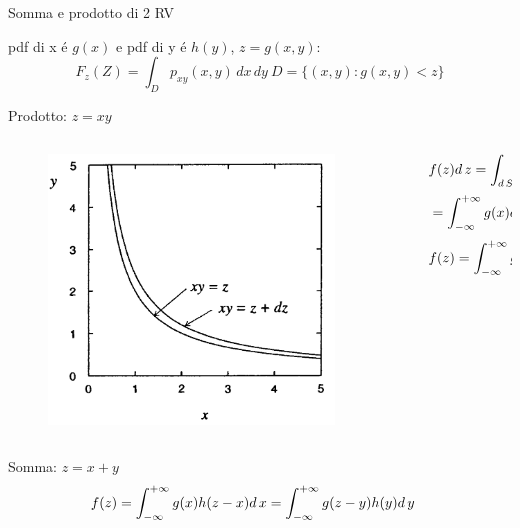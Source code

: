 \documentclass[asd-beamer.tex]{subfiles}
\begin{document}
\begin{frame}{Somma e prodotto di 2 RV}
\begin{block}{}
pdf di x \'e $g(x)$ e pdf di y \'e $h(y)$, $z=g(x,y)$:
\[F_z(Z)=\int_Dp_{xy}(x,y)\,dx\,dy\ D=\{(x,y):g(x,y)<z\}\]
\end{block}
\begin{block}{Prodotto: $z=xy$}
	\begin{columns}[T]
		\begin{column}{0.3\textwidth}
			\begin{figure}
				\centering
				\includegraphics[keepaspectratio,width=0.9\textwidth]{figures/cowan/probability/RVprod}
				\label{fig:RVprod}
			\end{figure}
		\end{column}
		\begin{column}{0.7\textwidth}
			\begin{align*}
			&f(z)d\,z=\int_{d\,S}g(x)h(y)d\,xd\,y\\
			&=\int_{-\infty}^{+\infty}{}g(x)d\,x\int_{\frac{z}{|x|}}^{\frac{z+d\,s}{|x|}}h(y)d\,y\\
			&f(z)=\int_{-\infty}^{+\infty}{}g(\frac{z}{y})h(y)\frac{d\,y}{|y|}
			\end{align*}
		\end{column}
	\end{columns}
\end{block}
\begin{block}{Somma: $z=x+y$}
	\begin{align*}
	&f(z)=\int_{-\infty}^{+\infty}{}g(x)h(z-x)d\,x=\int_{-\infty}^{+\infty}{}g(z-y)h(y)d\,y
	\end{align*}
\end{block}
\end{frame}
\end{document}
